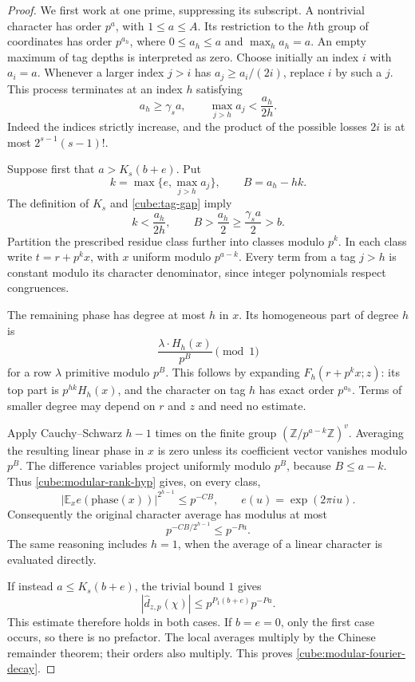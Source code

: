 \begin{proof}
We first work at one prime, suppressing its subscript.  A nontrivial
character has order $p^a$, with $1\leq a\leq A$.  Its restriction to the
$h$th group of coordinates has order $p^{a_h}$, where
$0\leq a_h\leq a$ and $\max_h a_h=a$.
An empty maximum of tag depths is interpreted as zero.
Choose initially an index $i$ with $a_i=a$.  Whenever a larger index $j>i$
has $a_j\geq a_i/(2i)$, replace $i$ by such a $j$.  This process terminates
at an index $h$ satisfying
\begin{equation}\label{cube:tag-gap}
 a_h\geq\gamma_s a,\qquad
 \max_{j>h}a_j<\frac{a_h}{2h}.
\end{equation}
Indeed the indices strictly increase, and the product of the possible
losses $2i$ is at most $2^{s-1}(s-1)!$.

Suppose first that $a>K_s(b+e)$.  Put
\[
 k=\max\{e,\max_{j>h}a_j\},\qquad B=a_h-hk.
\]
The definition of $K_s$ and \eqref{cube:tag-gap} imply
\[
 k<\frac{a_h}{2h},\qquad
 B>\frac{a_h}{2}\geq\frac{\gamma_s a}{2}>b.
\]
Partition the prescribed residue class further into classes modulo $p^k$.
In each class write $t=r+p^k x$, with $x$ uniform modulo $p^{a-k}$.
Every term from a tag $j>h$ is constant modulo its character denominator,
since integer polynomials respect congruences.

The remaining phase has degree at most $h$ in $x$.  Its homogeneous
part of degree $h$ is
\[
 \frac{\lambda\cdot H_h(x)}{p^B}\pmod1
\]
for a row $\lambda$ primitive modulo $p^B$.  This follows by expanding
$F_h(r+p^k x;z)$: its top part is $p^{hk}H_h(x)$, and the character on
tag $h$ has exact order $p^{a_h}$.  Terms of smaller degree may depend on
$r$ and $z$ and need no estimate.

Apply Cauchy--Schwarz $h-1$ times on the finite group
$(\mathbb Z/p^{a-k}\mathbb Z)^v$.  Averaging the resulting linear phase
in $x$ is zero unless its coefficient vector vanishes modulo $p^B$.
The difference variables project uniformly modulo $p^B$, because
$B\leq a-k$.  Thus \eqref{cube:modular-rank-hyp} gives, on every class,
\[
 |\mathbb E_x e(\text{phase}(x))|^{2^{h-1}}\leq p^{-CB},
 \qquad e(u)=\exp(2\pi i u).
\]
Consequently the original character average has modulus at most
\[
 p^{-CB/2^{h-1}}\leq p^{-Pa}.
\]
The same reasoning includes $h=1$, when the average of a linear
character is evaluated directly.

If instead $a\leq K_s(b+e)$, the trivial bound $1$ gives
\[
 |\widehat d_{z,p}(\chi)|
 \leq p^{P_1(b+e)}p^{-Pa}.
\]
This estimate therefore holds in both cases.  If $b=e=0$, only the first
case occurs, so there is no prefactor.  The local averages multiply by
the Chinese remainder theorem; their orders also multiply.  This proves
\eqref{cube:modular-fourier-decay}.


\end{proof}
